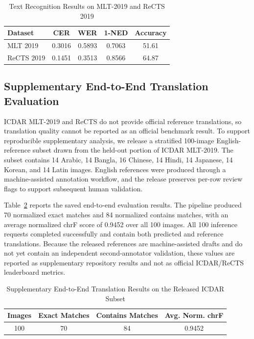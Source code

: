 \documentclass{ieeeaccess}
\begin{document}
\begin{table}[htbp]
\caption{Text Recognition Results on MLT-2019 and ReCTS 2019}
\label{tab:recognition}
\begin{center}
\begin{tabular}{|l|c|c|c|c|}
\hline
\textbf{Dataset} & \textbf{CER} & \textbf{WER} & \textbf{1-NED} & \textbf{Accuracy} \\
\hline
MLT 2019   & 0.3016 & 0.5893 & 0.7063 & 51.61 \\
ReCTS 2019 & 0.1451 & 0.3513 & 0.8566 & 64.87 \\
\hline
\end{tabular}
\end{center}
\end{table}

\subsection{Supplementary End-to-End Translation Evaluation}

ICDAR MLT-2019 and ReCTS do not provide official reference translations, so
translation quality cannot be reported as an official benchmark result. To
support reproducible supplementary analysis, we release a stratified
100-image English-reference subset drawn from the held-out portion of ICDAR
MLT-2019. The subset contains 14 Arabic, 14 Bangla, 16 Chinese, 14 Hindi, 14
Japanese, 14 Korean, and 14 Latin images. English references were produced
through a machine-assisted annotation workflow, and the release preserves
per-row review flags to support subsequent human validation.

Table~\ref{tab:translation} reports the saved end-to-end evaluation results.
The pipeline produced 70 normalized exact matches and 84 normalized contains
matches, with an average normalized chrF score of 0.9452 over all 100 images.
All 100 inference requests completed successfully and contain both predicted
and reference translations. Because the released references are
machine-assisted drafts and do not yet contain an independent second-annotator
validation, these values are reported as supplementary repository results and
not as official ICDAR/ReCTS leaderboard metrics.

\begin{table}[htbp]
\caption{Supplementary End-to-End Translation Results on the Released ICDAR Subset}
\label{tab:translation}
\begin{center}
\begin{tabular}{|c|c|c|c|}
\hline
\textbf{Images} & \textbf{Exact Matches} & \textbf{Contains Matches} & \textbf{Avg. Norm. chrF} \\
\hline
100 & 70 & 84 & 0.9452 \\
\hline
\end{tabular}
\end{center}
\end{table}
\end{document}
